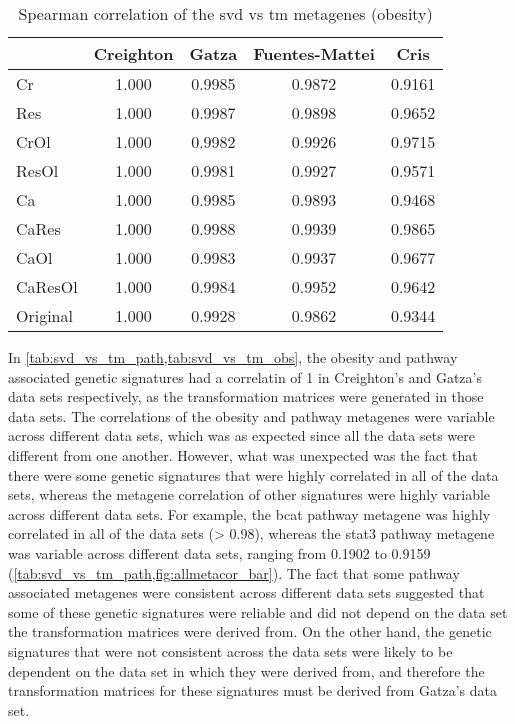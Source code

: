 \begin{table}[htpb]
	\centering
	\caption{Spearman correlation of the svd vs tm metagenes (obesity)}
	\label{tab:svd_vs_tm_obs}
	\begin{tabular}{lcccc}
		& Creighton & Gatza  & Fuentes-Mattei & Cris\\
		\hline
		\hline
		\rule{0pt}{2.25ex} Cr & 1.000     & 0.9985 & 0.9872 & 0.9161 \\
		Res                   & 1.000     & 0.9987 & 0.9898 & 0.9652 \\
		CrOl                  & 1.000     & 0.9982 & 0.9926 & 0.9715 \\
		ResOl                 & 1.000     & 0.9981 & 0.9927 & 0.9571 \\
		Ca                    & 1.000     & 0.9985 & 0.9893 & 0.9468 \\
		CaRes                 & 1.000     & 0.9988 & 0.9939 & 0.9865 \\
		CaOl                  & 1.000     & 0.9983 & 0.9937 & 0.9677 \\
		CaResOl               & 1.000     & 0.9984 & 0.9952 & 0.9642 \\
		Original              & 1.000     & 0.9928 & 0.9862 & 0.9344 \\
		\hline
		\hline
	\end{tabular}
\end{table}

In \cref{tab:svd_vs_tm_path,tab:svd_vs_tm_obs}, the obesity and pathway associated genetic signatures had a correlatin of 1 in Creighton's and Gatza's data sets respectively, as the transformation matrices were generated in those data sets.
The correlations of the obesity and pathway metagenes were variable across different data sets, which was as expected since all the data sets were different from one another.
However, what was unexpected was the fact that there were some genetic signatures that were highly correlated in all of the data sets, whereas the metagene correlation of other signatures were highly variable across different data sets.
For example, the \gls{bcat} pathway metagene was highly correlated in all of the data sets (\textgreater{} 0.98), whereas the \gls{stat3} pathway metagene was variable across different data sets, ranging from 0.1902 to 0.9159 (\cref{tab:svd_vs_tm_path,fig:allmetacor_bar}).
The fact that some pathway associated metagenes were consistent across different data sets suggested that some of these genetic signatures were reliable and did not depend on the data set the transformation matrices were derived from.
On the other hand, the genetic signatures that were not consistent across the data sets were likely to be dependent on the data set in which they were derived from, and therefore the transformation matrices for these signatures must be derived from Gatza's data set.

